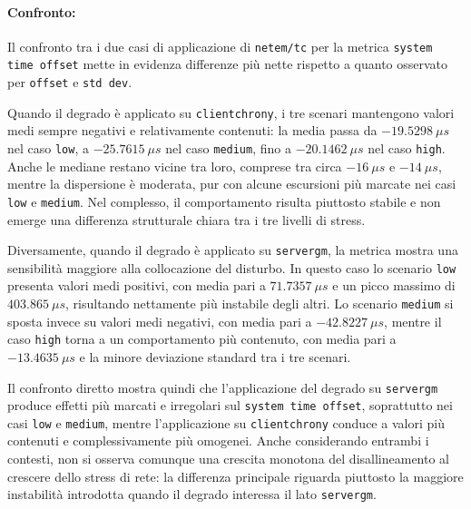 \paragraph*{Confronto:}
Il confronto tra i due casi di applicazione di \texttt{netem/tc} per la metrica \texttt{system
time offset} mette in evidenza differenze più nette rispetto a quanto osservato
per \texttt{offset} e \texttt{std dev}.

Quando il degrado è applicato su \texttt{clientchrony}, i tre scenari mantengono
valori medi sempre negativi e relativamente contenuti: la media passa da $-19.529
8~\mu s$ nel caso \texttt{low}, a $-25.7615~\mu s$ nel caso \texttt{medium}, fino
a $-20.1462~\mu s$ nel caso \texttt{high}. Anche le mediane restano vicine tra loro,
comprese tra circa $-16~\mu s$ e $-14~\mu s$, mentre la dispersione è moderata,
pur con alcune escursioni più marcate nei casi \texttt{low} e \texttt{medium}. Nel
complesso, il comportamento risulta piuttosto stabile e non emerge una
differenza strutturale chiara tra i tre livelli di stress.

Diversamente, quando il degrado è applicato su \texttt{servergm}, la metrica mostra
una sensibilità maggiore alla collocazione del disturbo. In questo caso lo
scenario \texttt{low} presenta valori medi positivi, con media pari a
$71.7357~\mu s$ e un picco massimo di $403.865~\mu s$, risultando nettamente più instabile
degli altri. Lo scenario \texttt{medium} si sposta invece su valori medi negativi,
con media pari a $-42.8227~\mu s$, mentre il caso \texttt{high} torna a un
comportamento più contenuto, con media pari a $-13.4635~\mu s$ e la minore deviazione
standard tra i tre scenari.

Il confronto diretto mostra quindi che l’applicazione del degrado su \texttt{servergm}
produce effetti più marcati e irregolari sul \texttt{system time offset},
soprattutto nei casi \texttt{low} e \texttt{medium}, mentre l’applicazione su \texttt{clientchrony}
conduce a valori più contenuti e complessivamente più omogenei. Anche considerando
entrambi i contesti, non si osserva comunque una crescita monotona del
disallineamento al crescere dello stress di rete: la differenza principale riguarda
piuttosto la maggiore instabilità introdotta quando il degrado interessa il lato \texttt{servergm}.